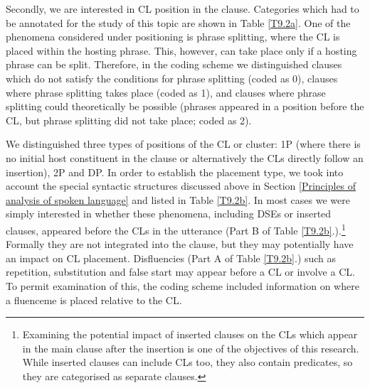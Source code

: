 Secondly, we are interested in CL position in the clause. Categories which had to be annotated for the study of this topic are shown in Table \ref{T9.2a}. One of the phenomena considered under positioning is phrase splitting, where the CL is placed within the hosting phrase. This, however, can take place only if a hosting phrase can be split. Therefore, in the coding scheme we distinguished clauses which do not satisfy the conditions for phrase splitting (coded as 0), clauses where phrase splitting takes place (coded as 1), and clauses where phrase splitting could theoretically be possible (phrases appeared in a position before the CL, but phrase splitting did not take place; coded as 2).

We distinguished three types of positions of the CL or cluster: 1P (where there is no initial host constituent in the clause or alternatively the CLs directly follow an insertion), 2P and DP. In order to establish the placement type, we took into account the special syntactic structures discussed above in Section \ref{Principles of analysis of spoken language} and listed in Table \ref{T9.2b}. In most cases we were simply interested in whether these phenomena, including DSEs or inserted clauses, appeared before the CLs in the utterance (Part B of Table \ref{T9.2b}.).\footnote{Examining the potential impact of inserted clauses on the CLs which appear in the main clause after the insertion is one of the objectives of this research. While inserted clauses can include CLs too, they also contain predicates, so they are categorised as separate clauses.} Formally they are not integrated into the clause, but they may potentially have an impact on CL placement. Disfluencies (Part A of Table \ref{T9.2b}.) such as repetition, substitution and false start may appear before a CL or involve a CL. To permit examination of this, the coding scheme included information on where a fluenceme is placed relative to the CL. 

